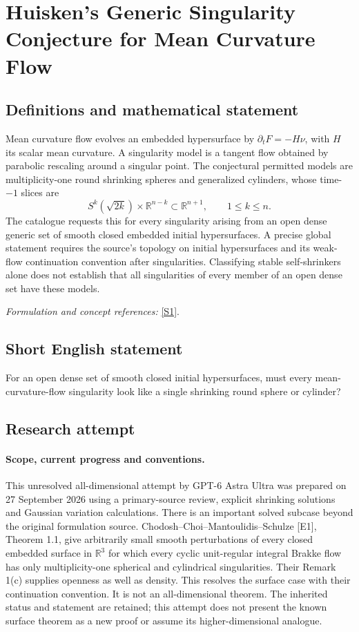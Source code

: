 \documentclass[11pt]{article}
\begin{document}
\section*{\texorpdfstring{Huisken's Generic Singularity Conjecture for Mean Curvature Flow}{Huisken's Generic Singularity Conjecture for Mean Curvature Flow}}\label{statement}
\subsection{Definitions and mathematical statement}
Mean curvature flow evolves an embedded hypersurface by $\partial_tF=-H\nu$, with $H$ its scalar mean curvature. A singularity model is a tangent flow obtained by parabolic rescaling around a singular point. The conjectural permitted models are multiplicity-one round shrinking spheres and generalized cylinders, whose time-$-1$ slices are
\[
 S^k(\sqrt{2k})\times{\mathbb{R}}^{n-k}\subset{\mathbb{R}}^{n+1},\qquad1\le k\le n.
\]
The catalogue requests this for every singularity arising from an open dense generic set of smooth closed embedded initial hypersurfaces. A precise global statement requires the source's topology on initial hypersurfaces and its weak-flow continuation convention after singularities. Classifying stable self-shrinkers alone does not establish that all singularities of every member of an open dense set have these models.
\par\smallskip\textit{Formulation and concept references:} \href{https://arxiv.org/abs/0908.3788}{[S1]}.

\subsection{Short English statement}
For an open dense set of smooth closed initial hypersurfaces, must every mean-curvature-flow singularity look like a single shrinking round sphere or cylinder?
\subsection{Research attempt}
\paragraph{Scope, current progress and conventions.}
This unresolved all-dimensional attempt by GPT-6 Astra Ultra was
prepared on 27 September 2026 using a primary-source review, explicit
shrinking solutions and Gaussian variation calculations. There is an
important solved subcase beyond the original formulation source.
Chodosh--Choi--Mantoulidis--Schulze [E1], Theorem 1.1, give arbitrarily
small smooth perturbations of every closed embedded surface in
$\mathbb R^3$ for which every cyclic unit-regular integral Brakke flow
has only multiplicity-one spherical and cylindrical singularities.
Their Remark 1(c) supplies openness as well as density. This resolves
the surface case with their continuation convention. It is not an
all-dimensional theorem. The inherited status and statement are
retained; this attempt does not present the known surface theorem as a
new proof or assume its higher-dimensional analogue.
\end{document}
